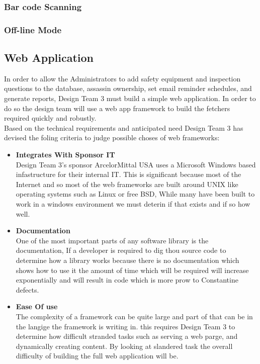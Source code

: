 \documentclass[Letter,11pt]{article}
\begin{document}
	\subsubsection{Bar code Scanning}
	
	\subsubsection{Off-line Mode}
	
	\subsection{Web Application}
		In order to allow the Administrators to add safety equipment and inspection questions to the database, assassin ownership, set email reminder schedules, and generate reports, Design Team 3 must build a simple web application. In order to do so the design team will use a web app framework to build the fetchers required quickly and robustly.
		\\
		Based on the technical requirements and anticipated need Design Team 3 has devised the foling criteria to judge possible choses of web frameworks: 
		\\
		\begin{minipage}[t]{0.5\textwidth}
		\begin{itemize}
			\item \textbf{Integrates With Sponsor IT}\\
			Design Team 3's sponsor ArcelorMittal USA uses a Microsoft Windows based infastructure for their internal IT. This is significant because  most of the Internet and so most of the web frameworks are built around UNIX like operating systems such as Linux or free BSD, While many have been built to work in a windows environment we must deterin if that exists and if so how well.
			
			\item \textbf{Documentation}\\
			One of the most important parts of any software library is the documentation, If a developer is required to dig thou source code to determine how a library works because there is no documentation which shows how to use it the amount of time which will be required will increase exponentially and will result in code which is more prow to Constantine defects.
				
			\item \textbf{Ease Of use} \\
			The complexity of a framework can be quite large and part of that can be in the langige the framework is writing in. this requires Design Team 3 to determine how difficult stranded tasks such as serving a web parge, and dynamically creating content. By looking at slandered task the overall difficulty of building the full web application will be.	
		\end{itemize}
		\end{minipage}
\end{document}
